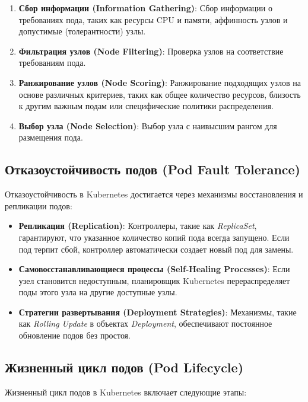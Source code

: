 \begin{enumerate}
   \item \textbf{Сбор информации (Information Gathering)}: Сбор информации о
требованиях пода, таких как ресурсы CPU и памяти, аффинность узлов и
допустимые (толерантности) узлы.
   \item \textbf{Фильтрация узлов (Node Filtering)}: Проверка узлов на соответствие
требованиям пода.
   \item \textbf{Ранжирование узлов (Node Scoring)}: Ранжирование подходящих узлов
на основе различных критериев, таких как общее количество ресурсов, близость к
другим важным подам или специфические политики распределения.
   \item \textbf{Выбор узла (Node Selection)}: Выбор узла с наивысшим рангом
для размещения пода.
\end{enumerate}

\subsection*{Отказоустойчивость подов (Pod Fault Tolerance)}

Отказоустойчивость в Kubernetes достигается через механизмы восстановления и
репликации подов:

\begin{itemize}
   \item \textbf{Репликация (Replication)}: Контроллеры, такие как
\textit{ReplicaSet}, гарантируют, что указанное количество копий пода всегда
запущено. Если под терпит сбой, контроллер автоматически создает новый под для
замены.
   \item \textbf{Самовосстанавливающиеся процессы (Self-Healing Processes)}: Если узел
становится недоступным, планировщик Kubernetes перераспределяет поды этого узла
на другие доступные узлы.
   \item \textbf{Стратегии развертывания (Deployment Strategies)}: Механизмы,
такие как \textit{Rolling Update} в объектах \textit{Deployment}, обеспечивают
постоянное обновление подов без простоя.
\end{itemize}

\subsection*{Жизненный цикл подов (Pod Lifecycle)}

Жизненный цикл подов в Kubernetes включает следующие этапы:

